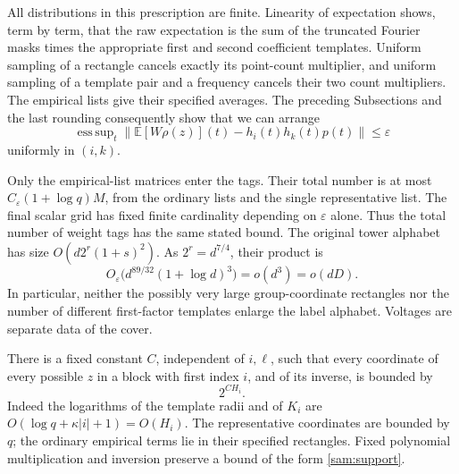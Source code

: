 All distributions in this prescription are finite.  Linearity of
expectation shows, term by term, that the raw expectation is the
sum of the truncated Fourier masks times the appropriate first and
second coefficient templates.  Uniform sampling of a rectangle
cancels exactly its point-count multiplier, and uniform sampling of
a template pair and a frequency cancels their two count multipliers.
The empirical lists give their specified averages.  The preceding
Subsections and the last rounding consequently show that we can
arrange
\begin{equation}\label{sam:edge-mean}
 \mathop{\mathrm{ess\,sup}}_t
 \bigl\|\mathbb E[W\rho(z)](t)-h_i(t)h_k(t)p(t)\bigr\|
 \le\varepsilon
\end{equation}
uniformly in \((i,k)\).

Only the empirical-list matrices enter the tags.  Their total number
is at most \(C_\varepsilon(1+\log q)M\), from the ordinary lists
and the single representative list.  The final scalar grid has
fixed finite cardinality depending on \(\varepsilon\) alone.
Thus the total number of weight tags has the same stated bound.
The original tower alphabet has size
\(O(d2^r(1+s)^2)\).  As \(2^r=d^{7/4}\), their product is
\[
 O_\varepsilon\bigl(d^{89/32}(1+\log d)^3\bigr)=o(d^3)=o(dD).
\]
In particular, neither the possibly very large group-coordinate
rectangles nor the number of different first-factor templates enlarge
the label alphabet.  Voltages are separate data of the cover.

There is a fixed constant \(C\), independent of \(i,\ell\), such
that every coordinate of every possible \(z\) in a block with first
index \(i\), and of its inverse, is bounded by
\begin{equation}\label{sam:support}
 2^{CH_i}.
\end{equation}
Indeed the logarithms of the template radii and of \(K_i\) are
\(O(\log q+\kappa|i|+1)=O(H_i)\).  The representative coordinates
are bounded by \(q\); the ordinary empirical terms lie in their
specified rectangles.  Fixed polynomial multiplication and inversion
preserve a bound of the form \eqref{sam:support}.

